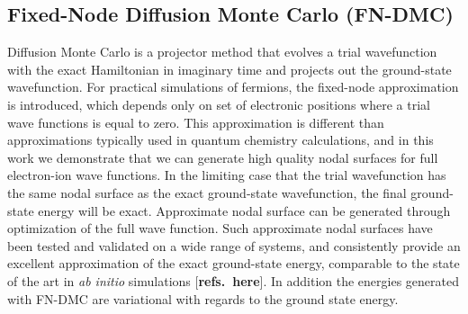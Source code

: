 \documentclass[pra,superscriptaddress,groupedaddress,twocolumn]{revtex4}
\begin{document}
\subsection{Fixed-Node Diffusion Monte Carlo (FN-DMC)}
Diffusion Monte Carlo is a projector method that evolves a trial wavefunction with the exact Hamiltonian in imaginary time and projects out the ground-state wavefunction.  For practical simulations of fermions, the fixed-node approximation is introduced, which depends only on set of electronic positions where a trial wave functions is equal to zero.  This approximation is different than approximations typically used in quantum chemistry calculations, and in this work we demonstrate that we can generate high quality nodal surfaces for full electron-ion wave functions. %
In the limiting case that  the trial wavefunction has the same nodal surface as the exact ground-state wavefunction, the final ground-state energy will be exact. Approximate nodal surface can be generated through optimization of the full wave function. Such approximate nodal surfaces have been tested and validated on a wide range of systems, and consistently provide an excellent approximation of the exact ground-state energy,  comparable to the state of the art in \textit{ab initio} simulations [{\bf refs.~here}].
 In addition the energies generated with FN-DMC are variational with regards to the ground state energy.  %
\end{document}
